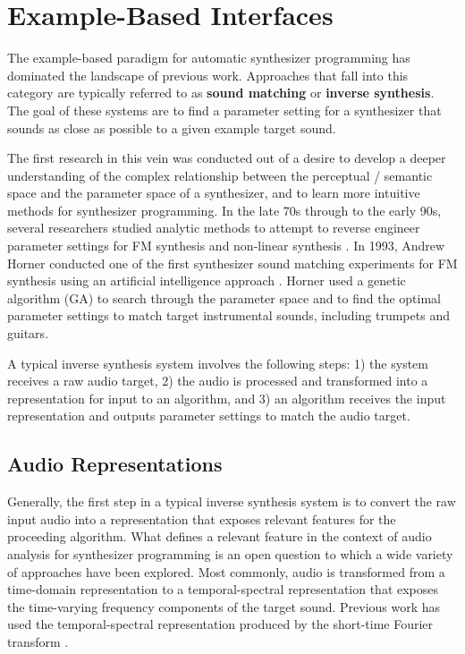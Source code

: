 \section{Example-Based Interfaces}
\label{sec:asp-example-based}
The example-based paradigm for automatic synthesizer programming has dominated the landscape of previous work. Approaches that fall into this category are typically referred to as \textbf{sound matching} or \textbf{inverse synthesis}. The goal of these systems are to find a parameter setting for a synthesizer that sounds as close as possible to a given example target sound. 

The first research in this vein was conducted out of a desire to develop a deeper understanding of the complex relationship between the perceptual / semantic space and the parameter space of a synthesizer, and to learn more intuitive methods for synthesizer programming. In the late 70s through to the early 90s, several researchers studied analytic methods to attempt to reverse engineer parameter settings for FM synthesis \cite{justice1979analytic, beauchamp1982synthesis, payne1987microcomputer} and non-linear synthesis \cite{delprat1990parameter}. In 1993, Andrew Horner conducted one of the first synthesizer sound matching experiments for FM synthesis using an artificial intelligence approach \cite{horner1993machine}. Horner used a genetic algorithm (GA) to search through the parameter space and to find the optimal parameter settings to match target instrumental sounds, including trumpets and guitars.

A typical inverse synthesis system involves the following steps: 1) the system receives a raw audio target, 2) the audio is processed and transformed into a representation for input to an algorithm, and 3) an algorithm receives the input representation and outputs parameter settings to match the audio target.


\subsection{Audio Representations}
Generally, the first step in a typical inverse synthesis system is to convert the raw input audio into a representation that exposes relevant features for the proceeding algorithm. What defines a relevant feature in the context of audio analysis for synthesizer programming is an open question to which a wide variety of approaches have been explored. Most commonly, audio is transformed from a time-domain representation to a temporal-spectral representation that exposes the time-varying frequency components of the target sound. Previous work has used the temporal-spectral representation produced by the short-time Fourier transform \cite{horner1995wavetable, horner1995envelope, horner1996piecewise, chinen2007genesynth, yee2007evolving, barkan2019inversynth}. 

